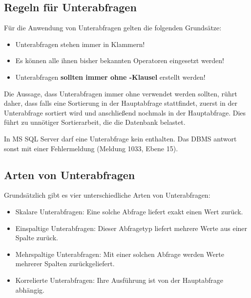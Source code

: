       \subsection{Regeln für Unterabfragen}
        Für die Anwendung von Unterabfragen gelten die folgenden Grundsätze:
        \begin{itemize}
          \item Unterabfragen stehen immer in Klammern!
          \item Es können alle ihnen bisher bekannten Operatoren eingesetzt werden!
          \item Unterabfragen \textbf{sollten immer ohne \ORDERBY-Klausel} erstellt werden!
        \end{itemize}
        Die Aussage, dass Unterabfragen immer ohne \ORDERBY{} verwendet werden sollten, rührt daher, dass falls eine Sortierung in der Hauptabfrage stattfindet, zuerst in der Unterabfrage sortiert wird und anschließend nochmals in der Hauptabfrage. Dies führt zu unnötiger Sortierarbeit, die die Datenbank belastet.

        \begin{merke}
          In MS SQL Server darf eine Unterabfrage kein \ORDERBY{} enthalten. Das DBMS antwort sonst mit einer Fehlermeldung (Meldung 1033, Ebene 15).
        \end{merke}
      \subsection{Arten von Unterabfragen}
        Grundsätzlich gibt es vier unterschiedliche Arten von Unterabfragen:
        \begin{itemize}
          \item Skalare Unterabfragen: Eine solche Abfrage liefert exakt einen Wert zurück.
          \item Einspaltige Unterabfragen: Dieser Abfragetyp liefert mehrere Werte aus einer Spalte zurück.
          \item Mehrspaltige Unterabfragen: Mit einer solchen Abfrage werden Werte mehrerer Spalten zurückgeliefert.
          \item Korrelierte Unterabfragen: Ihre Ausführung ist von der Hauptabfrage abhängig.
        \end{itemize}
\clearpage
